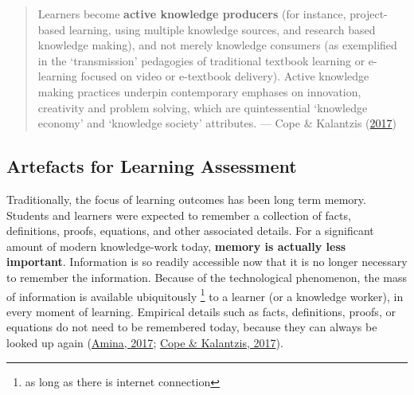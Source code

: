 \documentclass[letterpaper, nobind]{templates/ociamthesis}
\begin{document}
\begin{quote}
Learners become \textbf{active knowledge producers} (for instance, project-based learning, using multiple knowledge sources, and research based knowledge making), and not merely knowledge consumers (as exemplified in the `transmission' pedagogies of traditional textbook learning or e-learning focused on video or e-textbook delivery). Active knowledge making practices underpin contemporary emphases on innovation, creativity and problem solving, which are quintessential `knowledge economy' and `knowledge society' attributes.
\hfill --- Cope \& Kalantzis (\protect\hyperlink{ref-cope2017elearningc}{2017})
\end{quote}

\hypertarget{sec-bg-learn-artefact}{%
\subsection{Artefacts for Learning Assessment}\label{sec-bg-learn-artefact}}

Traditionally, the focus of learning outcomes has been long term memory.
Students and learners were expected to remember a collection of facts,
definitions, proofs, equations, and other associated details. For a
significant amount of modern knowledge-work today, \textbf{memory is actually
less important}. Information is so readily accessible now that it is no
longer necessary to remember the information. Because of the
technological phenomenon, the mass of information is available
ubiquitously \footnote{
  as long as there is internet connection} to a learner (or a knowledge worker), in every moment
of learning. Empirical details such as facts, definitions, proofs, or
equations do not need to be remembered today, because they can always be
looked up again (\protect\hyperlink{ref-amina2017active}{Amina, 2017}; \protect\hyperlink{ref-cope2017elearningc}{Cope \& Kalantzis, 2017}).
\end{document}

